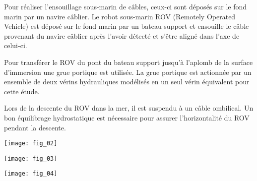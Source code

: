 \ifprof
\else
\begin{multicols}{2}
\fi

\setcounter{numques}{0}

Pour réaliser l’ensouillage sous-marin de câbles, ceux-ci sont déposés sur le fond marin par un navire câblier. Le robot sous-marin ROV (Remotely Operated Vehicle) est déposé sur le fond marin par un bateau support et ensouille le câble provenant
du navire câblier après l’avoir détecté et s’être aligné dans l’axe de celui-ci.

Pour transférer le ROV du pont du bateau support jusqu’à l’aplomb de la surface d’immersion une grue portique est utilisée. 
La grue portique est actionnée par un ensemble de deux vérins hydrauliques modélisés en un seul vérin équivalent pour cette étude.

Lors de la descente du ROV dans la mer, il est suspendu à un câble ombilical. Un bon équilibrage hydrostatique est
nécessaire pour assurer l’horizontalité du ROV pendant la descente.


\begin{center}
\texttt{[image: fig\_02]}
\end{center}

\begin{center}
\texttt{[image: fig\_03]}
\end{center}

\ifprof
\else
\end{multicols}
\fi

\begin{center}
\texttt{[image: fig\_04]}
\end{center}
